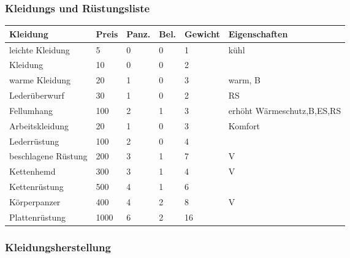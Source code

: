 \documentclass{article}
\begin{document}
\subsubsection{Kleidungs und Rüstungsliste}


\begin{small}
\begin{tabular}{|m{25mm}|m{1cm}|m{1cm}|m{1cm}|m{1cm}|m{6cm}|}
\hline
\textbf{Kleidung}&\textbf{Preis}&\textbf{Panz.}&\textbf{Bel.}&\textbf{Gewicht}&\textbf{Eigenschaften}\\
\hline
\hline
leichte Kleidung&5&0&0&1&kühl\\
\hline
Kleidung&10&0&0&2&\\
\hline
warme Kleidung&20&1&0&3&warm, B\\
\hline
Lederüberwurf&30&1&0&2&RS\\
\hline
Fellumhang&100&2&1&3&erhöht Wärmeschutz,B,ES,RS\\
\hline
Arbeitskleidung&20&1&0&3&Komfort\\
\hline
Lederrüstung&100&2&0&4&\\
\hline
beschlagene Rüstung&200&3&1&7&V\\
\hline
Kettenhemd&300&3&1&4&V\\
\hline
Kettenrüstung&500&4&1&6&\\
\hline
Körperpanzer&400&4&2&8&V\\
\hline
Plattenrüstung&1000&6&2&16&\\
\hline
\end{tabular}
\end{small}

\subsubsection{Kleidungsherstellung}
\end{document}
